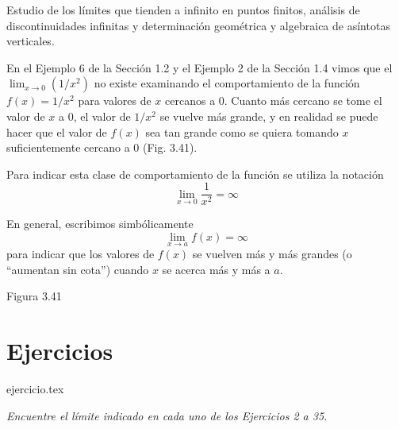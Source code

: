 
Estudio de los límites que tienden a infinito en puntos finitos, análisis de discontinuidades infinitas y determinación geométrica y algebraica de asíntotas verticales.

En el Ejemplo 6 de la Sección 1.2 y el Ejemplo 2 de la Sección 1.4 vimos que el $\displaystyle \lim_{x \to 0} (1/x^2)$ no existe examinando el comportamiento de la función $f(x) = 1/x^2$ para valores de $x$ cercanos a 0. Cuanto más cercano se tome el valor de $x$ a 0, el valor de $1/x^2$ se vuelve más grande, y en realidad se puede hacer que el valor de $f(x)$ sea tan grande como se quiera tomando $x$ suficientemente cercano a 0 (Fig. 3.41).

Para indicar esta clase de comportamiento de la función se utiliza la notación
$$\lim_{x \to 0} \frac{1}{x^2} = \infty$$

En general, escribimos simbólicamente
$$\lim_{x \to a} f(x) = \infty$$
para indicar que los valores de $f(x)$ se vuelven más y más grandes (o ``aumentan sin cota'') cuando $x$ se acerca más y más a $a$.

\begin{center}

\vspace{0.5em}
Figura 3.41
\end{center}

\vspace{1.5em}
\section*{Ejercicios}

\begin{enumerate}
    {ejercicio.tex}
\end{enumerate}

\noindent \textit{Encuentre el límite indicado en cada uno de los Ejercicios 2 a 35.}

